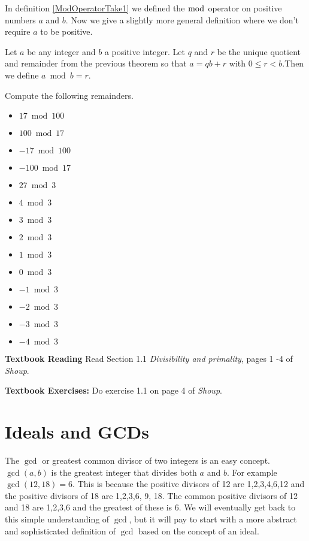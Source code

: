 \documentclass[oneside,12pt]{amsart}
\begin{document}
In definition \ref{ModOperatorTake1} we defined the $\bmod$ operator on positive
numbers $a$ and $b$. Now we give a slightly more general definition where we
don't require $a$ to be positive.

\begin{definition}
\label{ModOperator}
Let $a$ be any integer and $b$ a positive integer. Let $q$ and $r$
be the unique quotient and remainder from the previous theorem so that
$a=qb+r$ with $0\leq r < b$.Then we define
$a \bmod b=r$.
\end{definition}

\begin{homework} Compute the following remainders.
\begin{itemize}
\item $17 \bmod 100$
\item $100 \bmod 17$
\item $-17 \bmod 100$
\item $-100 \bmod 17$
\item $27 \bmod 3$
\item $4 \bmod 3$
\item $3 \bmod 3$
\item $2 \bmod 3$
\item $1 \bmod 3$
\item $0 \bmod 3$
\item $-1 \bmod 3$
\item $-2 \bmod 3$
\item $-3 \bmod 3$
\item $-4 \bmod 3$
\end{itemize}
\end{homework}

\textbf{Textbook Reading} Read Section 1.1
\emph{Divisibility and primality}, pages 1 -4 of \emph{Shoup}.

\textbf{Textbook Exercises:} Do exercise 1.1 on page 4 of \emph{Shoup}.

\newpage

\section{Ideals and GCDs}

The $\gcd$ or greatest common divisor of two integers is an easy concept.
$\gcd(a,b)$ is the greatest integer that divides both $a$ and $b$.
For example $\gcd(12,18) = 6$. This is because the positive divisors of 12 are
1,2,3,4,6,12 and the positive divisors of 18 are 1,2,3,6, 9, 18. The common
positive divisors of 12 and 18 are 1,2,3,6 and the greatest of these is 6.
We will eventually get back to this simple understanding of $\gcd$, but it will
pay to start with a more abstract and sophisticated definition of $\gcd$
based on the concept of an ideal.
\end{document}
